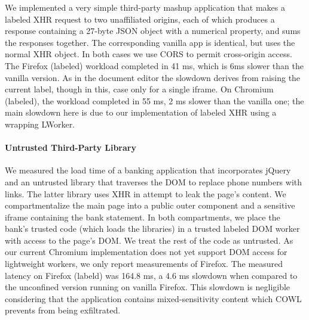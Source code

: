 We implemented a very simple third-party mashup application that makes
a labeled XHR request to two unaffiliated origins, each of which produces a
response containing a 27-byte JSON object with a numerical property,
and sums the responses together.
%
The corresponding vanilla app is identical, but uses the normal XHR
object.
%
In both cases we use CORS to permit cross-origin access.
%
The Firefox (labeled) workload completed in 41 ms, which is 6ms slower
than the vanilla version.
%
As in the document editor the slowdown derives from raising the
current label, though in this, case only for a single iframe.
%
On Chromium (labeled), the workload completed in 55 ms, 2 ms
slower than the vanilla one; the main slowdown here is due to our
implementation of labeled XHR using a wrapping LWorker.

\paragraph{Untrusted Third-Party Library}

We measured the load time of a banking application that incorporates
jQuery and an untrusted library that traverses the DOM to replace
phone numbers with links.
%
The latter library uses XHR in attempt to leak the page's content.
%
We compartmentalize the main page into a public outer component and a
sensitive iframe containing the bank statement. In both
compartments, we place the bank's trusted code (which loads the
libraries) in a trusted labeled DOM worker with access to the page's
DOM. We treat the rest of the code as untrusted.
%
As our current Chromium implementation does not yet support DOM access
for lightweight workers, we only report measurements of Firefox.
%
The measured latency on Firefox (labeld) was 164.8 ms, a 4.6 ms
slowdown when compared to the unconfined version running on vanilla
Firefox.
%
%
This slowdown is negligible considering that the application contains
mixed-sensitivity content which COWL prevents from being exfiltrated.





